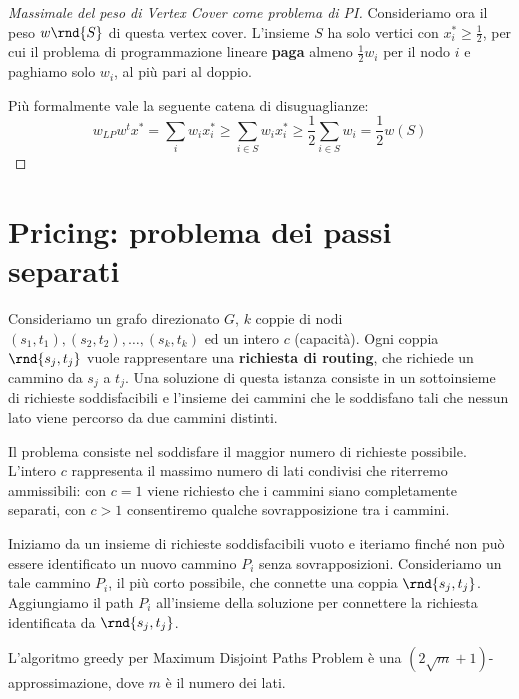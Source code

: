 \documentclass[\main/main.tex]{subfiles}
\begin{document}
\begin{multicols}{2}
\begin{proof}[Massimale del peso di Vertex Cover come problema di PI]
    Consideriamo ora il peso \(w\rnd{S}\) di questa vertex cover. L'insieme \(S\) ha solo vertici con \(x_{i}^{*} \geq \frac{1}{2}\), per cui il problema di programmazione lineare \textbf{paga} almeno \(\frac{1}{2} w_{i}\) per il nodo \(i\) e paghiamo solo \(w_i\), al più pari al doppio.
    
    Più formalmente vale la seguente catena di disuguaglianze:
    \[w_{L P} w^{t} x^{*}=\sum_{i} w_{i} x_{i}^{*} \geq \sum_{i \in S} w_{i} x_{i}^{*} \geq \frac{1}{2} \sum_{i \in S} w_{i}=\frac{1}{2} w(S)\]
\end{proof}
\end{multicols}
\clearpage
\section{Pricing: problema dei passi separati}
\begin{problem}
    Consideriamo un grafo direzionato \(G\), \(k\) coppie di nodi \(\left(s_{1}, t_{1}\right),\left(s_{2}, t_{2}\right), \ldots,\left(s_{k}, t_{k}\right)\) ed un intero \(c\) (capacità). Ogni coppia \(\rnd{s_j, t_j}\) vuole rappresentare una \textbf{richiesta di routing}, che richiede un cammino da \(s_j\) a \(t_j\). Una soluzione di questa istanza consiste in un sottoinsieme di richieste soddisfacibili e l'insieme dei cammini che le soddisfano tali che nessun lato viene percorso da due cammini distinti. 
    
    Il problema consiste nel soddisfare il maggior numero di richieste possibile. L'intero \(c\) rappresenta il massimo numero di lati condivisi che riterremo ammissibili: con \(c=1\) viene richiesto che i cammini siano completamente separati, con \(c>1\) consentiremo qualche sovrapposizione tra i cammini.
\end{problem}
\begin{definition}
    Iniziamo da un insieme di richieste soddisfacibili vuoto e iteriamo finché non può essere identificato un nuovo cammino \(P_i\) senza sovrapposizioni. Consideriamo un tale cammino \(P_i\), il più corto possibile, che connette una coppia \(\rnd{s_j, t_j}\). Aggiungiamo il path \(P_i\) all'insieme della soluzione per connettere la richiesta identificata da \(\rnd{s_j, t_j}\).
\end{definition}
\begin{lemma}
    L'algoritmo greedy per Maximum Disjoint Paths Problem è una \((2 \sqrt{m}+1)\)-approssimazione, dove \(m\) è il numero dei lati.
\end{lemma}
\end{document}
